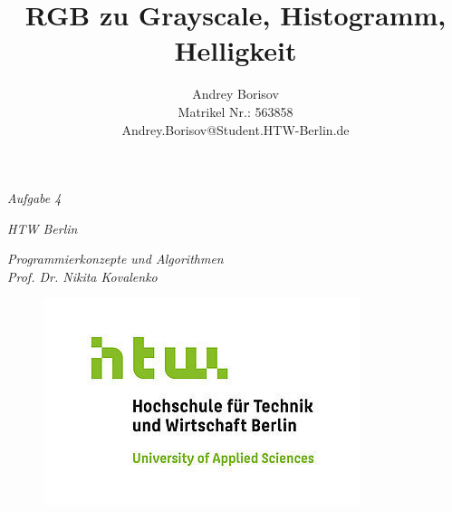 \documentclass[11pt]{amsart}
\title{RGB zu Grayscale, Histogramm, Helligkeit}
\author{Andrey Borisov\\ Matrikel Nr.: 563858 \\ Andrey.Borisov@Student.HTW-Berlin.de}
\begin{document}
\begin{titlepage}
\pagebreak
\hspace{0pt}
\vfill

\begin{center}

\fontsize{14}{17}\selectfont
\textit{Aufgabe 4}\\
\maketitle


\normalsize
\vspace{0.3cm}



\vspace{2cm}





\vspace{0.3cm}

\textit{HTW Berlin}

\vspace{0.1cm}

\textit{Programmierkonzepte und Algorithmen} \\
\vspace{0.3cm}
\textit{Prof. Dr. Nikita Kovalenko}



\end{center}

\vfill
\hspace{0pt}


\begin{figure}[htb]
 \raggedleft
 \includegraphics[scale=0.4]{images/htwLogo.jpg}
\end{figure}
\vspace{-1cm}
\pagebreak
\end{titlepage}
\end{document}
